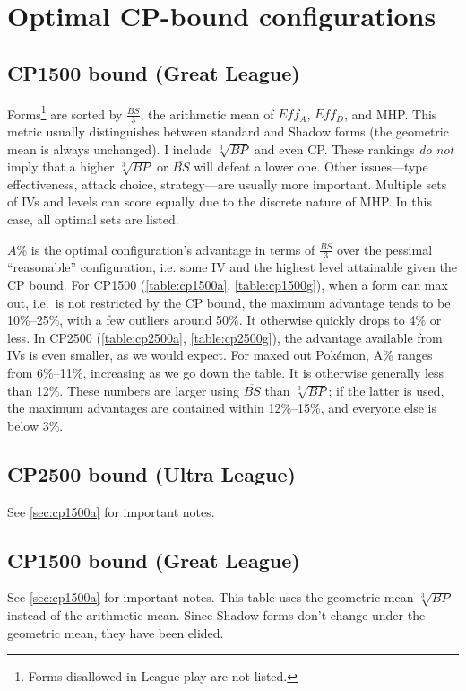 \documentclass[ebook,10pt,openany,oneside]{memoir}
\begin{document}
\chapter{Optimal CP-bound configurations\label{chap:optimal}}
\section{CP1500 bound (Great League)\label{sec:cp1500a}}
Forms\footnote{Forms disallowed in League play are not listed.} are sorted by $\frac{BS}{3}$,
  the arithmetic mean of $Eff_A$, $Eff_D$, and MHP\@.
This metric usually distinguishes between standard and Shadow forms (the geometric mean is always unchanged).
I include $\sqrt[3]{BP}$ and even CP\@.
These rankings \textit{do not} imply that a higher $\sqrt[3]{BP}$ or $\overline{BS}$
  will defeat a lower one.
Other issues---type effectiveness, attack choice, strategy---are usually more important.
Multiple sets of IVs and levels can score equally due to the discrete nature of MHP\@.
In this case, all optimal sets are listed.

$A\%$ is the optimal configuration's advantage in terms of $\frac{BS}{3}$
  over the pessimal ``reasonable'' configuration, i.e. some IV
  and the highest level attainable given the CP bound.
For CP1500 (\autoref{table:cp1500a}, \autoref{table:cp1500g}), when a form can max out, i.e.\ is not restricted by the CP bound,
  the maximum advantage tends to be 10\%--25\%, with a few outliers around 50\%.
It otherwise quickly drops to 4\% or less.
In CP2500 (\autoref{table:cp2500a}, \autoref{table:cp2500g}), the advantage available from IVs is even smaller, as we would expect.
For maxed out Pokémon, A\% ranges from 6\%--11\%, increasing as we go down the table.
It is otherwise generally less than 12\%.
These numbers are larger using $\overline{BS}$ than $\sqrt[3]{BP}$; if the latter is used,
  the maximum advantages are contained within 12\%--15\%, and everyone
  else is below 3\%.

\section{CP2500 bound (Ultra League)}
See \autoref{sec:cp1500a} for important notes.

\section{CP1500 bound (Great League)\label{sec:cp1500g}}
See \autoref{sec:cp1500a} for important notes.
This table uses the geometric mean $\sqrt[3]{BP}$ instead of the arithmetic mean.
Since Shadow forms don't change under the geometric mean, they have been elided.

\end{document}
